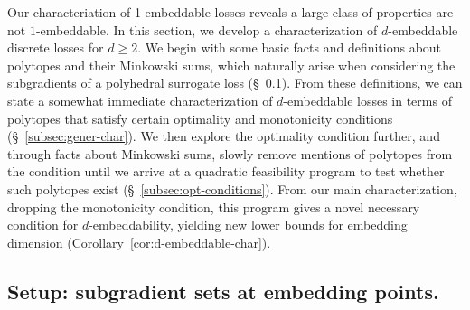 \documentclass[anon]{colt2020} %
\newcommand{\reals}{\mathbb{R}}
\newcommand{\R}{\mathcal{R}}
\newcommand{\Y}{\mathcal{Y}}
\newcommand{\inprod}[2]{\langle #1, #2 \rangle}%
\begin{document}
Our characteriation of 1-embeddable losses reveals a large class of properties are not $1$-embeddable.
In this section, we develop a characterization of $d$-embeddable discrete losses for $d \geq 2$.
We begin with some basic facts and definitions about polytopes and their Minkowski sums, which naturally arise when considering the subgradients of a polyhedral surrogate loss (\S~\ref{subsec:sub-sets}).
From these definitions, we can state a somewhat immediate characterization of $d$-embeddable losses in terms of polytopes that satisfy certain optimality and monotonicity conditions (\S~\ref{subsec:gener-char}).
We then explore the optimality condition further, and through facts about Minkowski sums, slowly remove mentions of polytopes from the condition until we arrive at a quadratic feasibility program to test whether such polytopes exist (\S~\ref{subsec:opt-conditions}).
From our main characterization, dropping the monotonicity condition, this program gives a novel necessary condition for $d$-embeddability, yielding new lower bounds for embedding dimension (Corollary~\ref{cor:d-embeddable-char}).

\subsection{Setup: subgradient sets at embedding points.}\label{subsec:sub-sets}
\end{document}
